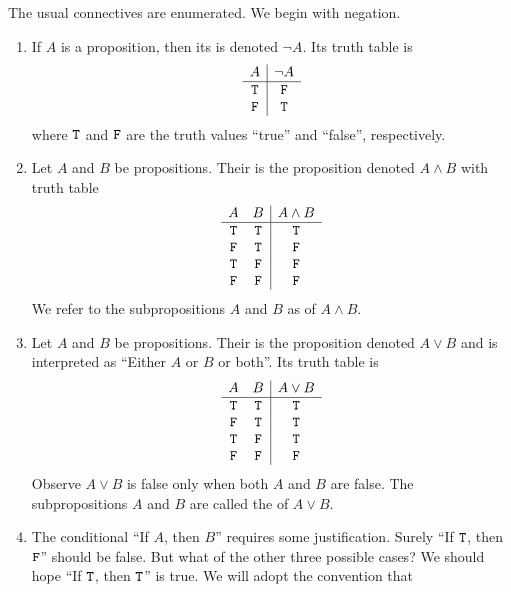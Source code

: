 \begin{node}[Semantics]\label{prop-000K}%
\begin{node}[Connectives]\label{prop-0001}%
  The usual connectives are enumerated. We begin with negation.
\begin{enumerate}
\item If $A$ is
a proposition, then its  is denoted $\neg A$. Its truth table is
\[\begin{array}{c|c}
A & \neg A\\ \hline
\mathtt{T} & \mathtt{F}\\
\mathtt{F} & \mathtt{T}\\
\end{array}\]
where $\mathtt{T}$ and $\mathtt{F}$ are the truth values ``true'' and
``false'', respectively.
\item Let $A$ and $B$ be propositions. Their  is the
  proposition denoted $A\land B$ with truth table
\[\begin{array}{cc|c}
A & B & A\land B\\\hline
\mathtt{T}  & \mathtt{T}  & \mathtt{T}\\
\mathtt{F} & \mathtt{T}  & \mathtt{F}\\
\mathtt{T}  & \mathtt{F} & \mathtt{F}\\
\mathtt{F} & \mathtt{F} & \mathtt{F}\\
\end{array}\]
We refer to the subpropositions $A$ and $B$ as  of
$A\land B$.
\item Let $A$ and $B$ be propositions. Their  is the
  proposition denoted $A\lor B$ and is interpreted as ``Either $A$ or
  $B$ or both''. Its truth table is
\[\begin{array}{cc|c}
A & B & A\lor B\\\hline
\mathtt{T}  & \mathtt{T}  & \mathtt{T}\\
\mathtt{F} & \mathtt{T}  & \mathtt{T}\\
\mathtt{T}  & \mathtt{F} & \mathtt{T}\\
\mathtt{F} & \mathtt{F} & \mathtt{F}\\
\end{array}\]
Observe $A\lor B$ is false only when both $A$ and $B$ are false.
The subpropositions $A$ and $B$ are called the  of
$A\lor B$.
\item The conditional ``If $A$, then $B$'' requires some
  justification. Surely ``If $\mathtt{T}$, then $\mathtt{F}$'' should be
  false. But what of the other three possible cases? We should hope ``If
  $\mathtt{T}$, then $\mathtt{T}$'' is true. We will adopt the convention that

\end{enumerate}
\end{node}
\end{node}
